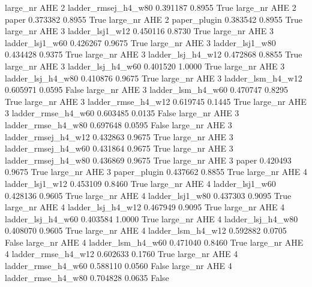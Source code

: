   large_nr      AHE                 2 ladder_rmsej_h4_w80   0.391187      0.8955    True
  large_nr      AHE                 2               paper   0.373382      0.8955    True
  large_nr      AHE                 2        paper_plugin   0.383542      0.8955    True
  large_nr      AHE                 3     ladder_lsj1_w12   0.450116      0.8730    True
  large_nr      AHE                 3     ladder_lsj1_w60   0.426267      0.9675    True
  large_nr      AHE                 3     ladder_lsj1_w80   0.434428      0.9375    True
  large_nr      AHE                 3   ladder_lsj_h4_w12   0.472868      0.8855    True
  large_nr      AHE                 3   ladder_lsj_h4_w60   0.401520      1.0000    True
  large_nr      AHE                 3   ladder_lsj_h4_w80   0.410876      0.9675    True
  large_nr      AHE                 3   ladder_lsm_h4_w12   0.605971      0.0595   False
  large_nr      AHE                 3   ladder_lsm_h4_w60   0.470747      0.8295    True
  large_nr      AHE                 3  ladder_rmse_h4_w12   0.619745      0.1445    True
  large_nr      AHE                 3  ladder_rmse_h4_w60   0.603485      0.0135   False
  large_nr      AHE                 3  ladder_rmse_h4_w80   0.697648      0.0595   False
  large_nr      AHE                 3 ladder_rmsej_h4_w12   0.432863      0.9675    True
  large_nr      AHE                 3 ladder_rmsej_h4_w60   0.431864      0.9675    True
  large_nr      AHE                 3 ladder_rmsej_h4_w80   0.436869      0.9675    True
  large_nr      AHE                 3               paper   0.420493      0.9675    True
  large_nr      AHE                 3        paper_plugin   0.437662      0.8855    True
  large_nr      AHE                 4     ladder_lsj1_w12   0.453109      0.8460    True
  large_nr      AHE                 4     ladder_lsj1_w60   0.428136      0.9605    True
  large_nr      AHE                 4     ladder_lsj1_w80   0.437303      0.9095    True
  large_nr      AHE                 4   ladder_lsj_h4_w12   0.467949      0.9095    True
  large_nr      AHE                 4   ladder_lsj_h4_w60   0.403584      1.0000    True
  large_nr      AHE                 4   ladder_lsj_h4_w80   0.408070      0.9605    True
  large_nr      AHE                 4   ladder_lsm_h4_w12   0.592882      0.0705   False
  large_nr      AHE                 4   ladder_lsm_h4_w60   0.471040      0.8460    True
  large_nr      AHE                 4  ladder_rmse_h4_w12   0.602633      0.1760    True
  large_nr      AHE                 4  ladder_rmse_h4_w60   0.588110      0.0560   False
  large_nr      AHE                 4  ladder_rmse_h4_w80   0.704828      0.0635   False
